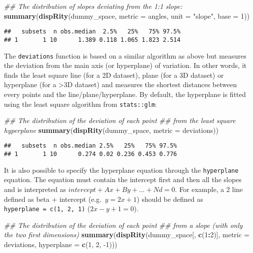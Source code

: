\documentclass[
]{book}
\newenvironment{Shaded}{\begin{snugshade}}{\end{snugshade}}
\newcommand{\CommentTok}[1]{\textcolor[rgb]{0.56,0.35,0.01}{\textit{#1}}}
\newcommand{\DataTypeTok}[1]{\textcolor[rgb]{0.13,0.29,0.53}{#1}}
\newcommand{\DecValTok}[1]{\textcolor[rgb]{0.00,0.00,0.81}{#1}}
\newcommand{\KeywordTok}[1]{\textcolor[rgb]{0.13,0.29,0.53}{\textbf{#1}}}
\newcommand{\NormalTok}[1]{#1}
\newcommand{\OperatorTok}[1]{\textcolor[rgb]{0.81,0.36,0.00}{\textbf{#1}}}
\newcommand{\StringTok}[1]{\textcolor[rgb]{0.31,0.60,0.02}{#1}}
\begin{document}
\begin{Shaded}
\begin{Highlighting}[]
\CommentTok{\#\# The distribution of slopes deviating from the 1:1 slope:}
\KeywordTok{summary}\NormalTok{(}\KeywordTok{dispRity}\NormalTok{(dummy\_space, }\DataTypeTok{metric =}\NormalTok{ angles, }\DataTypeTok{unit =} \StringTok{"slope"}\NormalTok{,}
                 \DataTypeTok{base =} \DecValTok{1}\NormalTok{))}
\end{Highlighting}
\end{Shaded}

\begin{verbatim}
##   subsets  n obs.median  2.5%   25%   75% 97.5%
## 1       1 10      1.389 0.118 1.065 1.823 2.514
\end{verbatim}

The \texttt{deviations} function is based on a similar algorithm as above but measures the deviation from the main axis (or hyperplane) of variation.
In other words, it finds the least square line (for a 2D dataset), plane (for a 3D dataset) or hyperplane (for a \textgreater3D dataset) and measures the shortest distances between every points and the line/plane/hyperplane.
By default, the hyperplane is fitted using the least square algorithm from \texttt{stats::glm}:

\begin{Shaded}
\begin{Highlighting}[]
\CommentTok{\#\# The distribution of the deviation of each point}
\CommentTok{\#\# from the least square hyperplane}
\KeywordTok{summary}\NormalTok{(}\KeywordTok{dispRity}\NormalTok{(dummy\_space, }\DataTypeTok{metric =}\NormalTok{ deviations))}
\end{Highlighting}
\end{Shaded}

\begin{verbatim}
##   subsets  n obs.median 2.5%   25%   75% 97.5%
## 1       1 10      0.274 0.02 0.236 0.453 0.776
\end{verbatim}

It is also possible to specify the hyperplane equation through the \texttt{hyperplane} equation. The equation must contain the intercept first and then all the slopes and is interpreted as \(intercept + Ax + By + ... + Nd = 0\). For example, a 2 line defined as beta + intercept (e.g.~\(y = 2x + 1\)) should be defined as \texttt{hyperplane\ =\ c(1,\ 2,\ 1)} (\(2x - y + 1 = 0\)).

\begin{Shaded}
\begin{Highlighting}[]
\CommentTok{\#\# The distribution of the deviation of each point}
\CommentTok{\#\# from a slope (with only the two first dimensions)}
\KeywordTok{summary}\NormalTok{(}\KeywordTok{dispRity}\NormalTok{(dummy\_space[, }\KeywordTok{c}\NormalTok{(}\DecValTok{1}\OperatorTok{:}\DecValTok{2}\NormalTok{)], }\DataTypeTok{metric =}\NormalTok{ deviations,}
                 \DataTypeTok{hyperplane =} \KeywordTok{c}\NormalTok{(}\DecValTok{1}\NormalTok{, }\DecValTok{2}\NormalTok{, }\DecValTok{{-}1}\NormalTok{)))}
\end{Highlighting}
\end{Shaded}
\end{document}
